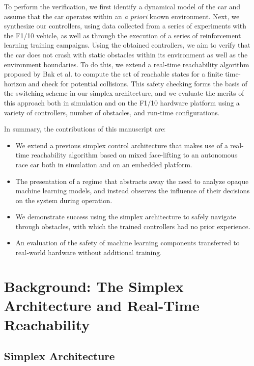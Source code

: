 \documentclass[manuscript,screen,review]{acmart}
\newcommand{\todo}[1]{\textcolor{red}{\textbf{\underline{TODO:}} #1}}
\begin{document}
To perform the verification, we first identify a dynamical model of the car and assume that the car operates within an \textit{a priori} known environment. Next, we synthesize our controllers, using data collected from a series of experiments with the F1/10 vehicle, as well as through the execution of a series of reinforcement learning training campaigns. Using the obtained controllers, we aim to verify that the car does not crash with static obstacles within its environment as well as the environment boundaries. To do this, we extend a real-time reachability algorithm proposed by Bak et al. \cite{Bak2014,Johnson2016} to compute the set of reachable states for a finite time-horizon and check for potential collisions. This safety checking forms the basis of the switching scheme in our simplex architecture, and we evaluate the merits of this approach both in simulation and on the F1/10 hardware platform using a variety of controllers, number of obstacles, and run-time configurations.

In summary, the contributions of this manuscript are: 
\begin{itemize}
    \item We extend a previous simplex control architecture that makes use of a real-time reachability algorithm based on mixed face-lifting to an autonomous race car both in simulation and on an embedded platform.
    \item The presentation of a regime that abstracts away the need to analyze opaque machine learning models, and instead observes the influence of their decisions on the system during operation.
    \item We demonstrate success using the simplex architecture to safely navigate through obstacles, with which the trained controllers had no prior experience.
    \item An evaluation of the safety of machine learning components transferred to real-world hardware without additional training.
\end{itemize}
\section{Background: The Simplex Architecture and Real-Time Reachability}

\subsection{Simplex Architecture}
\end{document}
